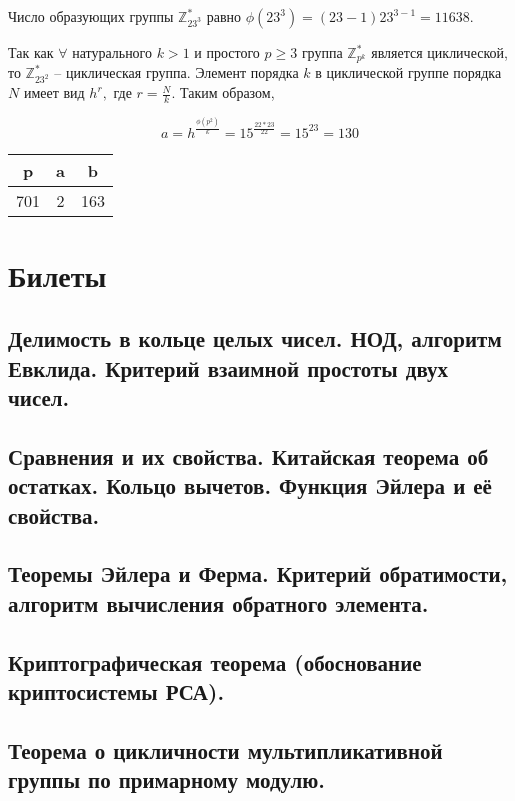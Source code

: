 \documentclass[a4paper,11pt,openany]{book}
\begin{document}

Число образующих группы $\mathbb{Z}_{23^3}^*$ равно $\phi(23^3) = (23 - 1) 23 ^ {3 - 1} = 11638.$


Так как $\forall$ натурального $k>1$ и простого $p \ge 3$ группа $\mathbb{Z}_{p^k}^*$ является циклической, то $\mathbb{Z}_{23^2}^*$ -- циклическая группа. Элемент порядка $k$ в циклической группе порядка $N$ имеет вид $h^r,$ где $r = \frac{N}{k}.$ Таким образом,

$$ a = h ^ { \frac{\phi(p ^ 2)}{k} } = 15 ^ { \frac{22 * 23}{22} } = 15 ^ {23} = 130 $$


\medskip

{\centering
\begin{tabular}{||c|c|c||}
\hline
\textbf{p} & \textbf{a} & \textbf{b} \\
\hline
701 & 2 & 163 \\
\hline
\end{tabular}

}

\medskip



\chapter{Билеты}
\section{Делимость в кольце целых чисел. НОД, алгоритм Евклида. Критерий взаимной простоты двух чисел.}
\section{Сравнения и их свойства. Китайская теорема об остатках. Кольцо вычетов. Функция Эйлера и её свойства.}
\section{Теоремы Эйлера и Ферма. Критерий обратимости, алгоритм вычисления обратного элемента.}
\section{Криптографическая теорема (обоснование криптосистемы РСА).}
\section{Теорема о цикличности мультипликативной группы по примарному модулю.}
\end{document}
